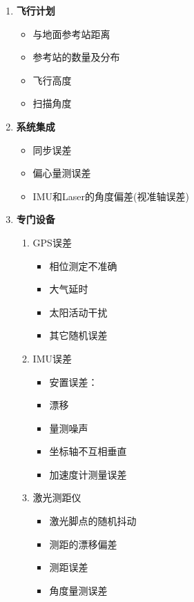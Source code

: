 \begin{multicols}{2}
	\begin{enumerate}
		\item \textbf{飞行计划}
			\begin{itemize}
				\item 与地面参考站距离
				\item 参考站的数量及分布
				\item 飞行高度
				\item 扫描角度
			\end{itemize}
		\item \textbf{系统集成}
			\begin{itemize}
				\item 同步误差
				\item 偏心量测误差
				\item IMU和Laser的角度偏差(视准轴误差)
			\end{itemize}
		\item \textbf{专门设备}
			\begin{enumerate}
				\item {\cukai GPS误差}
					\begin{itemize}
						\item 相位测定不准确
						\item 大气延时
						\item 太阳活动干扰
						\item 其它随机误差
					\end{itemize}
				\item {\cukai IMU误差}
					\begin{itemize}
						\item 安置误差：
						\item 漂移
						\item 量测噪声
						\item 坐标轴不互相垂直
						\item 加速度计测量误差
					\end{itemize}
				\item {\cukai 激光测距仪}
					\begin{itemize}
						\item 激光脚点的随机抖动
						\item 测距的漂移偏差
						\item 测距误差
						\item 角度量测误差

\end{itemize}
\end{enumerate}
\end{enumerate}
\end{multicols}
